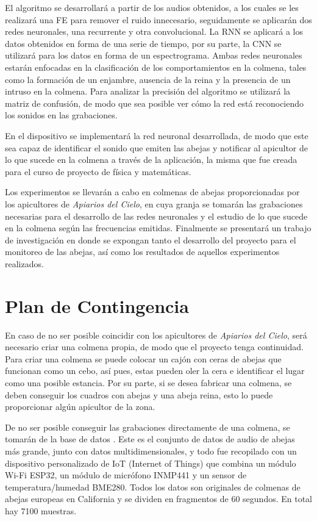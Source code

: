 \documentclass[12pt]{report}
\begin{document}
	\par El algoritmo se desarrollará a partir de los audios obtenidos, a los cuales se les realizará una FE para remover el ruido innecesario, seguidamente se aplicarán dos redes neuronales, una recurrente y otra convolucional. La RNN se aplicará a los datos obtenidos en forma de una serie de tiempo, por su parte, la CNN se utilizará para los datos en forma de un espectrograma. Ambas redes neuronales estarán enfocadas en la clasificación de los comportamientos en la colmena, tales como la formación de un enjambre, ausencia de la reina y la presencia de un intruso en la colmena. Para analizar la precisión del algoritmo se utilizará la matriz de confusión, de modo que sea posible ver cómo la red está reconociendo los sonidos en las grabaciones.
	
	\par En el dispositivo se implementará la red neuronal desarrollada, de modo que este sea capaz de identificar el sonido que emiten las abejas y notificar al apicultor de lo que sucede en la colmena a través de la aplicación, la misma que fue creada para el curso de proyecto de física y matemáticas.
	
	\par Los experimentos se llevarán a cabo en colmenas de abejas proporcionadas por los apicultores de \textit{Apiarios del Cielo}, en cuya granja se tomarán las grabaciones necesarias para el desarrollo de las redes neuronales y el estudio de lo que sucede en la colmena según las frecuencias emitidas. Finalmente se presentará un trabajo de investigación en donde se expongan tanto el desarrollo del proyecto para el monitoreo de las abejas, así como los resultados de aquellos experimentos realizados.
	
	\section{Plan de Contingencia}
	
	En caso de no ser posible coincidir con los apicultores de \textit{Apiarios del Cielo}, será necesario criar una colmena propia, de modo que el proyecto tenga continuidad. Para criar una colmena se puede colocar un cajón con ceras de abejas que funcionan como un cebo, así pues, estas pueden oler la cera e identificar el lugar como una posible estancia. Por su parte, si se desea fabricar una colmena, se deben conseguir los cuadros con abejas y una abeja reina, esto lo puede proporcionar algún apicultor de la zona.
	
	\par De no ser posible conseguir las grabaciones directamente de una colmena, se tomarán de la base de datos \cite{bee2022datasetsound}. Este es el conjunto de datos de audio de abejas más grande, junto con datos multidimensionales, y todo fue recopilado con un dispositivo personalizado de IoT (Internet of Things) que combina un módulo Wi-Fi ESP32, un módulo de micrófono INMP441 y un sensor de temperatura/humedad BME280. Todos los datos son originales de colmenas de abejas europeas en California y se dividen en fragmentos de 60 segundos. En total hay 7100 muestras.
	
\end{document}
